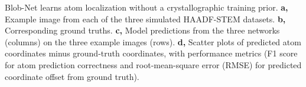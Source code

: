 \caption[Blob-Net learns atom localization without a crystallographic training prior]{Blob-Net learns atom localization without a crystallographic training prior. \textbf{a,} Example image from each of the three simulated HAADF-STEM datasets. \textbf{b,} Corresponding ground truths. \textbf{c,} Model predictions from the three networks (columns) on the three example images (rows). \textbf{d,} Scatter plots of predicted atom coordinates minus ground-truth coordinates, with performance metrics (F1 score for atom prediction correctness and root-mean-square error (RMSE) for predicted coordinate offset from ground truth).}
